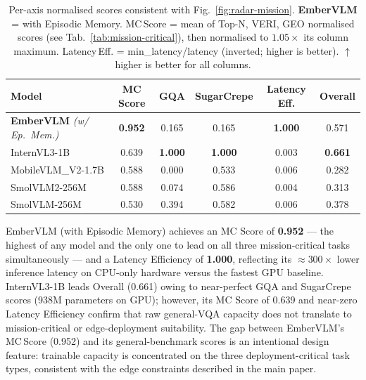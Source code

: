 \documentclass[runningheads]{llncs}
\begin{document}
\begin{table}[ht]
\centering
\caption{Per-axis normalised scores consistent with Fig.~\ref{fig:radar-mission}.
\textbf{EmberVLM} = with Episodic Memory. MC\,Score = mean of Top-N, VERI, GEO
normalised scores (see Tab.~\ref{tab:mission-critical}), then normalised to
$1.05\times$ its column maximum. Latency\,Eff. = min\_latency/latency
(inverted; higher is better). $\uparrow$ higher is better for all columns.}
\label{tab:composite}
\setlength{\tabcolsep}{4pt}
\scriptsize
\begin{tabular}{lc ccc | c}
\toprule
Model
  & \textbf{MC Score}
  & \textbf{GQA} & \textbf{SugarCrepe} & \textbf{Latency Eff.}
  & \textbf{Overall} \\
\midrule
\textbf{EmberVLM} \textit{\scriptsize(w/ Ep.\ Mem.)}
  & \textbf{0.952} & 0.165 & 0.165 & \textbf{1.000} & 0.571 \\
InternVL3-1B
  & 0.639 & \textbf{1.000} & \textbf{1.000} & 0.003 & \textbf{0.661} \\
MobileVLM\_V2-1.7B
  & 0.588 & 0.000 & 0.533 & 0.006 & 0.282 \\
SmolVLM2-256M
  & 0.588 & 0.074 & 0.586 & 0.004 & 0.313 \\
SmolVLM-256M
  & 0.530 & 0.394 & 0.582 & 0.006 & 0.378 \\
\bottomrule
\end{tabular}
\end{table}

EmberVLM (with Episodic Memory) achieves an MC Score of \textbf{0.952} — the
highest of any model and the only one to lead on all three mission-critical tasks
simultaneously — and a Latency Efficiency of \textbf{1.000}, reflecting its
${\approx}300\times$ lower inference latency on CPU-only hardware versus the fastest
GPU baseline. InternVL3-1B leads Overall (0.661) owing to near-perfect GQA
and SugarCrepe scores (938M parameters on GPU); however, its MC Score of 0.639
and near-zero Latency Efficiency confirm that raw general-VQA
capacity does not translate to mission-critical or edge-deployment suitability.
The gap between EmberVLM's MC\,Score (0.952) and its general-benchmark scores
is an intentional design feature: trainable capacity is concentrated on the three
deployment-critical task types, consistent with the edge constraints described
in the main paper.
\end{document}
